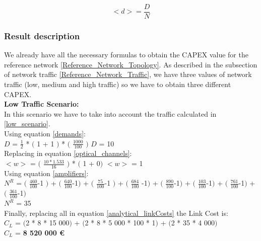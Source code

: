\begin{equation}
<d> = \frac{D}{N}
\label{average_demand}
\end{equation}


\subsubsection{Result description}

We already have all the necessary formulas to obtain the CAPEX value for the reference network \ref{Reference_Network_Topology}. As described in the subsection of network traffic \ref{Reference_Network_Traffic}, we have three values of network traffic (low, medium and high traffic) so we have to obtain three different CAPEX.\\

\textbf{Low Traffic Scenario:}\\
In this scenario we have to take into account the traffic calculated in \ref{low_scenario}.\\

Using equation \ref{demands}:\\

$D$ = $\frac{1}{2}$ * $($ 1 + 1 $)$ * $($ $\frac{1000}{100}$ $)$ \qquad \qquad $D$ = 10\\

Replacing in equation \ref{optical_channels}:\\

$<w>$ = $($ $\frac{10 * 1.533}{16}$ $)$ * $($ 1 + 0$)$ \qquad \qquad $<w>$ = 1\\

Using equation \ref{amplifiers}:\\

$N^R$ = $($ $\frac{460}{100}$-1 $)$ + $($ $\frac{640}{100}$-1$)$ + $($ $\frac{75}{100}$-1 $)$ + $($ $\frac{684}{100}$ -1$)$ + $($ $\frac{890}{100}$-1$)$ + $($ $\frac{103}{100}$-1$)$ + $($ $\frac{761}{100}$-1$)$ + $($ $\frac{361}{100}$-1$)$\\

$N^R$ = 35\\

Finally, replacing all in equation \ref{analytical_linkCosts} the Link Cost is:\\

$C_L$ = $($2 * 8 * 15 000$)$ + $($2 * 8 * 5 000 * 100 * 1$)$ + $($2 * 35 * 4 000$)$\\

$C_L$ = \textbf{8 520 000 \euro}\\

